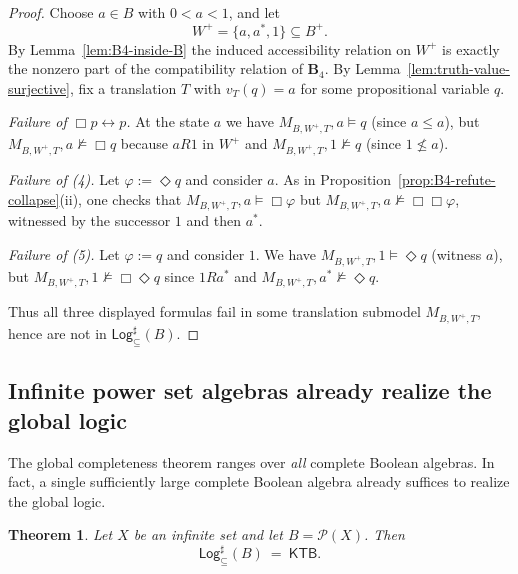 \documentclass[11pt]{amsart}
\theoremstyle{definition}
\theoremstyle{plain}
\newtheorem{theorem}[definition]{Theorem}
\newcommand{\Pow}{\mathcal P}
\newcommand{\Bfour}{\mathbf{B}_4}
\newcommand{\KTB}{\mathsf{KTB}}
\newcommand{\Logsub}{\mathsf{Log}_{\subseteq}^{\sharp}}
\begin{document}
\begin{proof}
Choose $a\in B$ with $0<a<1$, and let
\[
W^+=\{a,a^\ast,1\}\subseteq B^+.
\]
By Lemma~\ref{lem:B4-inside-B} the induced accessibility relation on $W^+$ is exactly the nonzero
part of the compatibility relation of $\Bfour$. By Lemma~\ref{lem:truth-value-surjective}, fix a translation
$T$ with $v_T(q)=a$ for some propositional variable $q$.

\smallskip\noindent\emph{Failure of $\Box p\leftrightarrow p$.}
At the state $a$ we have $M_{B,W^+,T},a\models q$ (since $a\le a$), but $M_{B,W^+,T},a\not\models \Box q$
because $aR1$ in $W^+$ and $M_{B,W^+,T},1\not\models q$ (since $1\not\le a$).

\smallskip\noindent\emph{Failure of (4).}
Let $\varphi:=\Diamond q$ and consider $a$.
As in Proposition~\ref{prop:B4-refute-collapse}(ii), one checks that $M_{B,W^+,T},a\models \Box\varphi$
but $M_{B,W^+,T},a\not\models \Box\Box\varphi$, witnessed by the successor $1$ and then $a^\ast$.

\smallskip\noindent\emph{Failure of (5).}
Let $\varphi:=q$ and consider $1$.
We have $M_{B,W^+,T},1\models \Diamond q$ (witness $a$), but $M_{B,W^+,T},1\not\models \Box\Diamond q$ since
$1Ra^\ast$ and $M_{B,W^+,T},a^\ast\not\models \Diamond q$.

Thus all three displayed formulas fail in some translation submodel $M_{B,W^+,T}$, hence are not in
$\Logsub(B)$.
\end{proof}

\subsection{Infinite power set algebras already realize the global logic}

The global completeness theorem ranges over \emph{all} complete Boolean algebras.
In fact, a single sufficiently large complete Boolean algebra already suffices to realize the global logic.

\begin{theorem}\label{thm:PowX-KTB}
Let $X$ be an infinite set and let $B=\Pow(X)$.
Then
\[
\Logsub(B)\ =\ \KTB.
\]
\end{theorem}
\end{document}
